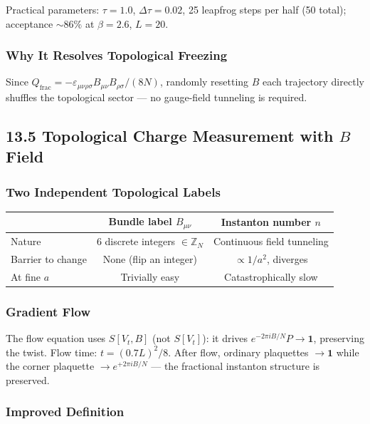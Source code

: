 \documentclass[12pt,a4paper]{article}
\begin{document}
Practical parameters: $\tau=1.0$, $\Delta\tau=0.02$, 25 leapfrog steps per half (50 total);
acceptance $\sim 86\%$ at $\beta=2.6$, $L=20$.

\subsubsection*{Why It Resolves Topological Freezing}

Since $Q_\mathrm{frac} = -\varepsilon_{\mu\nu\rho\sigma}B_{\mu\nu}B_{\rho\sigma}/(8N)$,
randomly resetting $B$ each trajectory directly shuffles the topological sector ---
no gauge-field tunneling is required.

\subsection*{13.5 Topological Charge Measurement with $B$ Field}

\subsubsection*{Two Independent Topological Labels}

\begin{table}[H]
\centering
\begin{tabular}{|l|c|c|}
\hline
 & Bundle label $B_{\mu\nu}$ & Instanton number $n$ \\
\hline
Nature & 6 discrete integers $\in\mathbb{Z}_N$ & Continuous field tunneling \\
Barrier to change & None (flip an integer) & $\propto 1/a^2$, diverges \\
At fine $a$ & Trivially easy & Catastrophically slow \\
\hline
\end{tabular}
\end{table}

\subsubsection*{Gradient Flow}

The flow equation uses $S[V_t,B]$ (not $S[V_t]$): it drives
$e^{-2\pi iB/N}P\to\mathbf{1}$, preserving the twist.
Flow time: $t=(0.7L)^2/8$.
After flow, ordinary plaquettes $\to\mathbf{1}$ while the corner plaquette
$\to e^{+2\pi iB/N}$ --- the fractional instanton structure is preserved.

\subsubsection*{Improved Definition}
\end{document}
